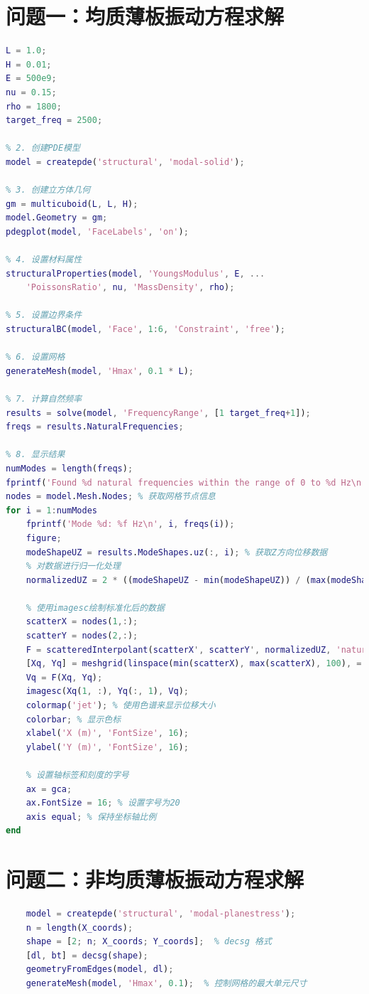 \documentclass[withoutpreface,bwprint]{cumcmthesis} %
\begin{document}
\begin{appendices}
\section{问题一：均质薄板振动方程求解} \label{fuluD}
\begin{lstlisting}[language=matlab]
% 1. 几何和材料属性设置
L = 1.0; 
H = 0.01; 
E = 500e9; 
nu = 0.15; 
rho = 1800; 
target_freq = 2500; 

% 2. 创建PDE模型
model = createpde('structural', 'modal-solid');

% 3. 创建立方体几何
gm = multicuboid(L, L, H);
model.Geometry = gm;
pdegplot(model, 'FaceLabels', 'on');

% 4. 设置材料属性
structuralProperties(model, 'YoungsModulus', E, ...
    'PoissonsRatio', nu, 'MassDensity', rho);

% 5. 设置边界条件
structuralBC(model, 'Face', 1:6, 'Constraint', 'free');

% 6. 设置网格
generateMesh(model, 'Hmax', 0.1 * L);

% 7. 计算自然频率
results = solve(model, 'FrequencyRange', [1 target_freq+1]);
freqs = results.NaturalFrequencies;

% 8. 显示结果
numModes = length(freqs);
fprintf('Found %d natural frequencies within the range of 0 to %d Hz\n', numModes, target_freq);
nodes = model.Mesh.Nodes; % 获取网格节点信息
for i = 1:numModes
    fprintf('Mode %d: %f Hz\n', i, freqs(i));
    figure;
    modeShapeUZ = results.ModeShapes.uz(:, i); % 获取Z方向位移数据
    % 对数据进行归一化处理
    normalizedUZ = 2 * ((modeShapeUZ - min(modeShapeUZ)) / (max(modeShapeUZ) - min(modeShapeUZ))) - 1;

    % 使用imagesc绘制标准化后的数据
    scatterX = nodes(1,:);
    scatterY = nodes(2,:);
    F = scatteredInterpolant(scatterX', scatterY', normalizedUZ, 'natural', 'none');
    [Xq, Yq] = meshgrid(linspace(min(scatterX), max(scatterX), 100), =                     linspace(min(scatterY), max(scatterY), 100));
    Vq = F(Xq, Yq);
    imagesc(Xq(1, :), Yq(:, 1), Vq);
    colormap('jet'); % 使用色谱来显示位移大小
    colorbar; % 显示色标
    xlabel('X (m)', 'FontSize', 16);
    ylabel('Y (m)', 'FontSize', 16);

    % 设置轴标签和刻度的字号
    ax = gca;
    ax.FontSize = 16; % 设置字号为20
    axis equal; % 保持坐标轴比例
end

\end{lstlisting}
\section{问题二：非均质薄板振动方程求解}\label{fuluE}
\begin{lstlisting}[language=matlab]
   % 创建 PDE 模型
    model = createpde('structural', 'modal-planestress');
    n = length(X_coords);
    shape = [2; n; X_coords; Y_coords];  % decsg 格式
    [dl, bt] = decsg(shape);
    geometryFromEdges(model, dl);
    generateMesh(model, 'Hmax', 0.1);  % 控制网格的最大单元尺寸


\end{lstlisting}
\end{appendices}
\end{document}

